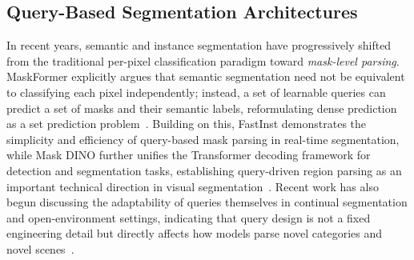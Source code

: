 \documentclass[journal]{IEEEtai}
\begin{document}


\subsection{Query-Based Segmentation Architectures}
\label{sec:rw-query}

In recent years, semantic and instance segmentation have progressively shifted from
the traditional per-pixel classification paradigm toward \emph{mask-level parsing}.
MaskFormer explicitly argues that semantic segmentation need not be equivalent to
classifying each pixel independently; instead, a set of learnable queries can predict
a set of masks and their semantic labels, reformulating dense prediction as a set
prediction problem~\cite{cheng2021perpixel}.
Building on this, FastInst demonstrates the simplicity and efficiency of query-based
mask parsing in real-time segmentation, while Mask DINO further unifies the Transformer
decoding framework for detection and segmentation tasks, establishing query-driven
region parsing as an important technical direction in visual
segmentation~\cite{he2023fastinstsimple,li2022maskdino}.
Recent work has also begun discussing the adaptability of queries themselves in
continual segmentation and open-environment settings, indicating that query design is
not a fixed engineering detail but directly affects how models parse novel categories
and novel scenes~\cite{zhu2025rethinkingquery}.
\end{document}
